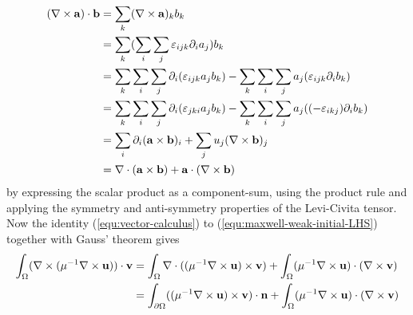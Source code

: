 \documentclass[11pt, a4paper]{article}
\begin{document}
\begin{align}
    (\nabla \times \mathbf{a}) \cdot \mathbf{b} &= \sum_k (\nabla \times \mathbf{a})_k b_k \notag \\ 
    &= \sum_k (\sum_i \sum_j \varepsilon_{ijk} \partial_i a_j) b_k \notag \\ 
    &= \sum_k \sum_i \sum_j \partial_i (\varepsilon_{ijk} a_j b_k) - \sum_k \sum_i \sum_j a_j (\varepsilon_{ijk} \partial_i b_k) \notag \\ 
    &= \sum_k \sum_i \sum_j \partial_i (\varepsilon_{jki} a_j b_k) - \sum_k \sum_i \sum_j a_j ((-\varepsilon_{ikj}) \partial_i b_k) \notag \\ 
    &= \sum_i \partial_i (\mathbf{a} \times \mathbf{b})_i + \sum_j u_j (\nabla \times \mathbf{b})_j \notag \\ 
    &= \nabla \cdot (\mathbf{a} \times \mathbf{b}) + \mathbf{a} \cdot (\nabla \times \mathbf{b}) \label{equ:curlidentity} 
\end{align}
by expressing the scalar product as a component-sum, using the product rule and
applying the symmetry and anti-symmetry properties of the Levi-Civita tensor.
Now the identity (\ref{equ:vector-calculus}) to (\ref{equ:maxwell-weak-initial-LHS})
together with Gauss' theorem gives
\begin{align}
    \int_{\Omega} (\nabla \times ({\mu^{-1} \nabla \times \mathbf{u}})) \cdot \mathbf{v} &=
    \int_{\Omega} \nabla \cdot (({\mu^{-1} \nabla \times \mathbf{u}}) \times \mathbf{v})
    + \int_{\Omega} ({\mu^{-1} \nabla \times \mathbf{u}}) \cdot (\nabla \times \mathbf{v}) \notag \\
    &= \int_{\partial \Omega} (({\mu^{-1} \nabla \times \mathbf{u}}) \times \mathbf{v}) \cdot \mathbf{n}
    + \int_{\Omega} ({\mu^{-1} \nabla \times \mathbf{u}}) \cdot (\nabla \times \mathbf{v}) \notag \\
\end{align}
\end{document}

